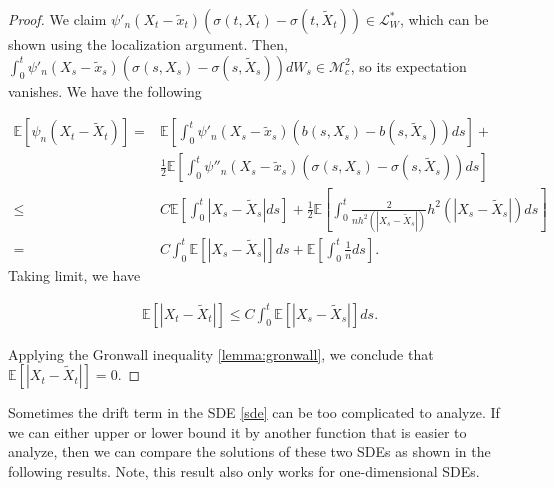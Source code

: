 \documentclass{article}
\begin{document}
\begin{proof}
We claim $\psi'_n(X_t-\tilde{x}_t)(\sigma(t,X_t)-\sigma(t,\tilde{X}_t))\in\mathcal{L}^*_W$, which can be shown using the localization argument. Then, $\int_0^t\psi'_n(X_s-\tilde{x}_s)(\sigma(s,X_s)-\sigma(s,\tilde{X}_s))dW_s\in\mathcal{M}_c^2$, so its expectation vanishes. We have the following

\begin{equation*}
\begin{aligned}
\mathbb{E}[\psi_n(X_t-\tilde{X}_t)]=&\mathbb{E}[\int^t_0\psi'_n(X_s-\tilde{x}_s)(b(s,X_s)-b(s,\tilde{X}_s))ds]+\\
&\frac{1}{2}\mathbb{E}[\int^t_0\psi''_n(X_s-\tilde{x}_s)(\sigma(s,X_s)-\sigma(s,\tilde{X}_s))ds]\\
\leq&C\mathbb{E}[\int^t_0|X_s-\tilde{X}_s|ds]+\frac{1}{2}\mathbb{E}[\int^t_0\frac{2}{nh^2(|X_s-\tilde{X}_s|)}h^2(|X_s-\tilde{X}_s|)ds]\\
=&C\int^t_0\mathbb{E}[|X_s-\tilde{X}_s|]ds+\mathbb{E}[\int^t_0\frac{1}{n}ds].
\end{aligned}
\end{equation*}
Taking limit, we have

\begin{equation*}
\begin{aligned}
\mathbb{E}[|X_t-\tilde{X}_t|]\leq C\int^t_0\mathbb{E}[|X_s-\tilde{X}_s|]ds.
\end{aligned}
\end{equation*}

Applying the Gronwall inequality \eqref{lemma:gronwall}, we conclude that $\mathbb{E}[|X_t-\tilde{X}_t|]=0$.

\end{proof}

Sometimes the drift term in the SDE \eqref{sde} can be too complicated to analyze. If we can either upper or lower bound it by another function that is easier to analyze, then we can compare the solutions of these two SDEs as shown in the following results. Note, this result also only works for one-dimensional SDEs. 
\end{document}
